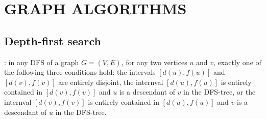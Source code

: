 \section{GRAPH ALGORITHMS}
\subsection{Depth-first search}
\bit
\w {}: in any DFS of a graph $G = (V, E)$,
  for any two vertices $u$ and $v$, exactly one of the following three
  conditions hold:
  \ben
  \w [(a)] the intervals $[d(u), f(u)]$ and $[d(v), f(v)]$ are entirely
  disjoint,
  \w [(b)] the internval $[d(u), f(u)]$ is entirely contained in $[d(v),
    f(v)]$ and $u$ is a descendant of $v$ in the DFS-tree, or
  \w [(c)] the internval $[d(v), f(v)]$ is entirely contained in $[d(u),
    f(u)]$ and $v$ is a descendant of $u$ in the DFS-tree.
  \een
\eit